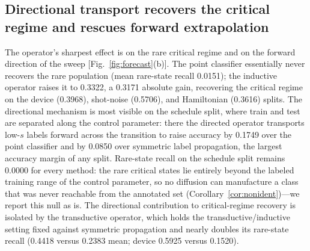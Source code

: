 \documentclass[aps,prresearch,reprint,amsmath,amssymb,nofootinbib,superscriptaddress,floatfix]{revtex4-2}
\theoremstyle{definition}
\theoremstyle{remark}
\theoremstyle{plain}
\begin{document}
\subsection{Directional transport recovers the critical regime and rescues forward extrapolation}
The operator's sharpest effect is on the rare critical regime and on the forward direction of the sweep
[Fig.~\ref{fig:forecast}(b)]. The point classifier essentially never recovers the rare population (mean
rare-state recall \num{0.0151}); the inductive operator raises it to \num{0.3322}, a \num{0.3171} absolute
gain, recovering the critical regime on the device (\num{0.3968}), shot-noise (\num{0.5706}), and
Hamiltonian (\num{0.3616}) splits. The directional mechanism is most visible on the schedule split, where
train and test are separated along the control parameter: there the directed operator transports
low-$s$ labels forward across the transition to raise accuracy by \num{0.1749} over the point classifier
and by \num{0.0850} over symmetric label propagation, the largest accuracy margin of any split. Rare-state
recall on the schedule split remains \num{0.0000} for every method: the rare critical states lie entirely
beyond the labeled training range of the control parameter, so no diffusion can manufacture a class that
was never reachable from the annotated set (Corollary~\ref{cor:nonident})---we report this null as is. The
directional contribution to critical-regime recovery is isolated by the transductive operator, which holds
the transductive/inductive setting fixed against symmetric propagation and nearly doubles its rare-state
recall (\num{0.4418} versus \num{0.2383} mean; device \num{0.5925} versus \num{0.1520}).

\begin{table}[t]
\centering
\caption{\textbf{Held-out phase classification on the synthetic quantum benchmark.} Full-scale
configuration: $n=\num{3000}$ states, $n_\text{seeds}=\num{5}$. For each leakage-checked split (device,
shot-noise batch, drive schedule, Hamiltonian perturbation) we report classification accuracy, expected
calibration error (ECE), and rare-state recall (seed means) for the inductive spectral-truncated
directed-diffusion operator (inductive STDD, the method), its transductive variant, symmetric label
propagation, and the inductive $k$NN baseline. Higher accuracy and recall are better; lower ECE is better.
The table is generated verbatim by \texttt{scripts/make\_tables.py} from \texttt{results/summary.json}; no
value is typed by hand.}
\label{tab:main}
\setlength{\tabcolsep}{8pt}

\end{table}
\end{document}

